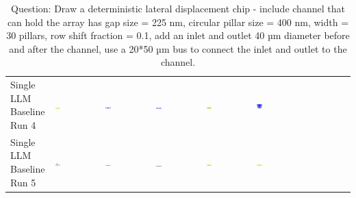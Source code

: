 \begin{table}
\begin{tabular}{@{}mmmmmm@{}}
    \makecell{Single LLM \\ Baseline \\ Run 4} & \includegraphics[width=0.13\textwidth]{./run_4/png/gpt-4o_results/DLDChip.png} & \includegraphics[width=0.13\textwidth]{./run_4/png/o1-preview_results/DLDChip.png} & \includegraphics[width=0.13\textwidth]{./run_4/png/claude-3-5-sonnet-20240620_results/DLDChip.png} & \includegraphics[width=0.13\textwidth]{./run_4/png/watsonx_meta-llama_llama-3-1-70b-instruct_results/DLDChip.png} & \includegraphics[width=0.13\textwidth]{./run_4/png/watsonx_meta-llama_llama-3-405b-instruct_results/DLDChip.png} \\
    \makecell{Single LLM \\ Baseline \\ Run 5} & \includegraphics[width=0.13\textwidth]{./run_5/png/gpt-4o_results/DLDChip.png} & \includegraphics[width=0.13\textwidth]{./run_5/png/o1-preview_results/DLDChip.png} & \includegraphics[width=0.13\textwidth]{./run_5/png/claude-3-5-sonnet-20240620_results/DLDChip.png} & \includegraphics[width=0.13\textwidth]{./run_5/png/watsonx_meta-llama_llama-3-1-70b-instruct_results/DLDChip.png} & \includegraphics[width=0.13\textwidth]{./run_5/png/watsonx_meta-llama_llama-3-405b-instruct_results/DLDChip.png} \\
    \bottomrule
  \end{tabular}
  \caption*{Question: Draw a deterministic lateral displacement chip - include channel that can hold the array has gap size = 225 nm, circular pillar size = 400 nm, width = 30 pillars, row shift fraction = 0.1, add an inlet and outlet 40 µm diameter before and after the channel, use a 20*50 µm bus to connect the inlet and outlet to the channel.}
\end{table}

